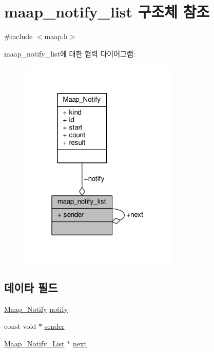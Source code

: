 \hypertarget{structmaap__notify__list}{}\section{maap\+\_\+notify\+\_\+list 구조체 참조}
\label{structmaap__notify__list}


{\ttfamily \#include $<$maap.\+h$>$}



maap\+\_\+notify\+\_\+list에 대한 협력 다이어그램\+:
\nopagebreak
\begin{figure}[H]
\begin{center}
\leavevmode
\includegraphics[width=214pt]{structmaap__notify__list__coll__graph}
\end{center}
\end{figure}
\subsection*{데이타 필드}
\begin{DoxyCompactItemize}
\item 
\hyperlink{struct_maap___notify}{Maap\+\_\+\+Notify} \hyperlink{structmaap__notify__list_a1f432a44e5c304a860941b05468fa821}{notify}
\item 
const void $\ast$ \hyperlink{structmaap__notify__list_a6da9953a2443ab3bd33eea3534c01fdd}{sender}
\item 
\hyperlink{maap_8h_aa1a438ce6dda4d8cf533ceeb49d3fd6a}{Maap\+\_\+\+Notify\+\_\+\+List} $\ast$ \hyperlink{structmaap__notify__list_af599eaac27b6bff8faccf3831694bace}{next}
\end{DoxyCompactItemize}


